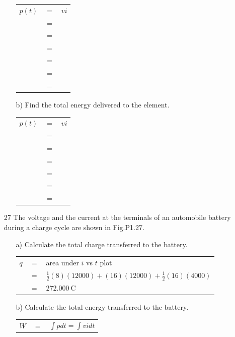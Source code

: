 \documentclass[a4paper]{article}
\begin{document}
\begin{itemize}
\begin{itemize}
\begin{tabular}{l c c}
		      	$p(t)$ & $=$ & $vi$ \\
		      	       & $=$ &      \\
		      	       & $=$ &      \\
		      	       & $=$ &      \\
		      	       & $=$ &      \\
		      	       & $=$ &      \\
		      	       & $=$ &      \\
		      \end{tabular}
		\item[b)] Find the total energy delivered to the element. \\
		      \begin{tabular}{l c c}
		      	$p(t)$ & $=$ & $vi$ \\
		      	       & $=$ &      \\
		      	       & $=$ &      \\
		      	       & $=$ &      \\
		      	       & $=$ &      \\
		      	       & $=$ &      \\
		      	       & $=$ &      \\
		      \end{tabular} 
	\end{itemize}
	\item[27] The voltage and the current at the terminals of an automobile battery during a charge cycle are shown in Fig.P1.27.
	      \begin{itemize}
	      	\item[a)] Calculate the total charge transferred to the battery. \\
	      	      \begin{tabular}{r c l}
	      	      	$q$ & $=$ & area under $i$ vs $t$ plot                                    \\
	      	      	    & $=$ & $\frac{1}{2}(8)(12000) + (16)(12000) + \frac{1}{2}(16)(4000)$ \\
	      	      	    & $=$ & $\SI{272,000}{\coulomb}$                                      \\
	      	      \end{tabular}
	      	\item[b)] Calculate the total energy transferred to the battery. \\
	      	      \begin{tabular}{r c l}
	      	      	$W$                                         & $=$ & $\int pdt = \int vidt$                                                      \\

\end{tabular}
\end{itemize}
\end{itemize}
\end{document}
